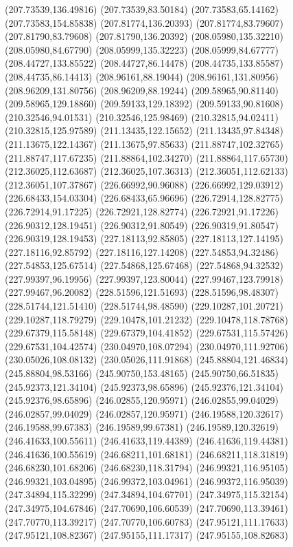 {(207.73539,136.49816) (207.73539,83.50184) (207.73583,65.14162) (207.73583,154.85838) (207.81774,136.20393) (207.81774,83.79607) (207.81790,83.79608) (207.81790,136.20392)
(208.05980,135.32210) (208.05980,84.67790) (208.05999,135.32223) (208.05999,84.67777) (208.44727,133.85522) (208.44727,86.14478) (208.44735,133.85587) (208.44735,86.14413)
(208.96161,88.19044) (208.96161,131.80956) (208.96209,131.80756) (208.96209,88.19244) (209.58965,90.81140) (209.58965,129.18860) (209.59133,129.18392) (209.59133,90.81608)
(210.32546,94.01531) (210.32546,125.98469) (210.32815,94.02411) (210.32815,125.97589) (211.13435,122.15652) (211.13435,97.84348) (211.13675,122.14367) (211.13675,97.85633)
(211.88747,102.32765) (211.88747,117.67235) (211.88864,102.34270) (211.88864,117.65730) (212.36025,112.63687) (212.36025,107.36313) (212.36051,112.62133) (212.36051,107.37867)
(226.66992,90.96088) (226.66992,129.03912) (226.68433,154.03304) (226.68433,65.96696) (226.72914,128.82775) (226.72914,91.17225) (226.72921,128.82774) (226.72921,91.17226)
(226.90312,128.19451) (226.90312,91.80549) (226.90319,91.80547) (226.90319,128.19453) (227.18113,92.85805) (227.18113,127.14195) (227.18116,92.85792) (227.18116,127.14208)
(227.54853,94.32486) (227.54853,125.67514) (227.54868,125.67468) (227.54868,94.32532) (227.99397,96.19956) (227.99397,123.80044) (227.99467,123.79918) (227.99467,96.20082)
(228.51596,121.51693) (228.51596,98.48307) (228.51744,121.51410) (228.51744,98.48590) (229.10287,101.20721) (229.10287,118.79279) (229.10478,101.21232) (229.10478,118.78768)
(229.67379,115.58148) (229.67379,104.41852) (229.67531,115.57426) (229.67531,104.42574) (230.04970,108.07294) (230.04970,111.92706) (230.05026,108.08132) (230.05026,111.91868)
(245.88804,121.46834) (245.88804,98.53166) (245.90750,153.48165) (245.90750,66.51835) (245.92373,121.34104) (245.92373,98.65896) (245.92376,121.34104) (245.92376,98.65896)
(246.02855,120.95971) (246.02855,99.04029) (246.02857,99.04029) (246.02857,120.95971) (246.19588,120.32617) (246.19588,99.67383) (246.19589,99.67381) (246.19589,120.32619)
(246.41633,100.55611) (246.41633,119.44389) (246.41636,119.44381) (246.41636,100.55619) (246.68211,101.68181) (246.68211,118.31819) (246.68230,101.68206) (246.68230,118.31794)
(246.99321,116.95105) (246.99321,103.04895) (246.99372,103.04961) (246.99372,116.95039) (247.34894,115.32299) (247.34894,104.67701) (247.34975,115.32154) (247.34975,104.67846)
(247.70690,106.60539) (247.70690,113.39461) (247.70770,113.39217) (247.70770,106.60783) (247.95121,111.17633) (247.95121,108.82367) (247.95155,111.17317) (247.95155,108.82683)
}
